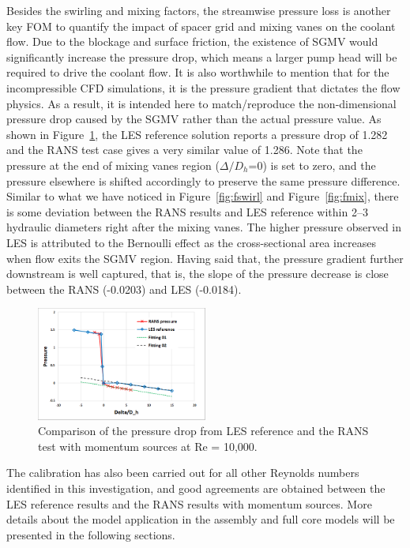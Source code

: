 Besides the swirling and mixing factors, the streamwise pressure loss is another key FOM to quantify the impact of spacer grid and mixing vanes on the coolant flow. Due to the blockage and surface friction, the existence of SGMV would significantly increase the pressure drop, which means a larger pump head will be required to drive the coolant flow. It is also worthwhile to mention that for the incompressible CFD simulations, it is the pressure gradient that dictates the flow physics. As a result, it is intended here to match/reproduce the non-dimensional pressure drop caused by the SGMV rather than the actual pressure value. As shown in Figure~\ref{fig:presloss}, the LES reference solution reports a pressure drop of 1.282 and the RANS test case gives a very similar value of 1.286. Note that the pressure at the end of mixing vanes region ($\Delta/D_h$=0) is set to zero, and the pressure elsewhere is shifted accordingly to preserve the same pressure difference. Similar to what we have noticed in Figure~\ref{fig:fswirl} and Figure~\ref{fig:fmix}, there is some deviation between the RANS results and LES reference within 2--3 hydraulic diameters right after the mixing vanes. The higher pressure observed in LES is attributed to the Bernoulli effect as the cross-sectional area increases when flow exits the SGMV region.  Having said that, the pressure gradient further downstream is well captured, that is, the slope of the pressure decrease is close between the RANS (-0.0203) and LES (-0.0184).

\begin{figure}[!ht]
\centering
\includegraphics[width=0.5\textwidth]{./figures/Results_pressure_loss.png}
\caption{Comparison of the pressure drop from LES reference and the RANS test with momentum sources at Re = 10,000. }
\label{fig:presloss}
\end{figure}

The calibration has also been carried out for all other Reynolds numbers identified in this investigation, and good agreements are obtained between the LES reference results and the RANS results with momentum sources. More details about the model application in the assembly and full core models will be presented in the following sections.
